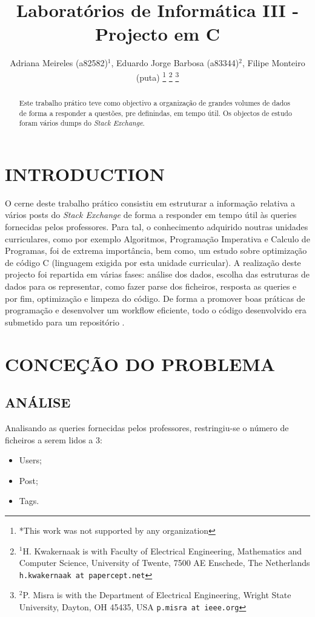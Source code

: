 \documentclass[letterpaper, 10 pt, conference]{IEEEtran}  %
\title{\LARGE \bf
Laboratórios de Informática III - Projecto em C
}
\author{Adriana Meireles (a82582)$^{1}$, Eduardo Jorge Barbosa (a83344)$^{2}$, Filipe Monteiro (puta)%
\thanks{*This work was not supported by any organization}%
\thanks{$^{1}$H. Kwakernaak is with Faculty of Electrical Engineering, Mathematics and Computer Science,
        University of Twente, 7500 AE Enschede, The Netherlands
        {\tt\small h.kwakernaak at papercept.net}}%
\thanks{$^{2}$P. Misra is with the Department of Electrical Engineering, Wright State University,
        Dayton, OH 45435, USA
        {\tt\small p.misra at ieee.org}}%
}
\begin{document}
\maketitle
\thispagestyle{empty}
\pagestyle{empty}


\begin{abstract}

Este trabalho prático teve como objectivo a organização de grandes volumes de dados de forma a responder a questões, pre definindas, em tempo útil. Os objectos de estudo foram vários dumps do \textit{Stack Exchange}.

\end{abstract}


\section{INTRODUCTION}

O cerne deste trabalho prático consistiu em estruturar a informação relativa a vários posts do \textit{Stack Exchange} de forma a responder em tempo útil às queries fornecidas pelos professores. Para tal, o conhecimento adquirido noutras unidades curriculares, como por exemplo Algoritmos, Programação Imperativa e Calculo de Programas, foi de extrema importância, bem como, um estudo sobre optimização de código C (linguagem exigida por esta unidade curricular). A realização deste projecto foi repartida em várias fases: análise dos dados, escolha das estruturas de dados para os representar, como fazer parse dos ficheiros, resposta as queries e por fim, optimização e limpeza do código. De forma a promover boas práticas de programação e desenvolver um workflow eficiente, todo o código desenvolvido era submetido para um repositório .

\section{CONCEÇÃO DO PROBLEMA}

\subsection{ANÁLISE}

Analisando as queries fornecidas pelos professores, restringiu-se o número de ficheiros a serem lidos a 3:

\begin{itemize}
\item Users;
\item Post;
\item Tags.
\end{itemize}
\end{document}
